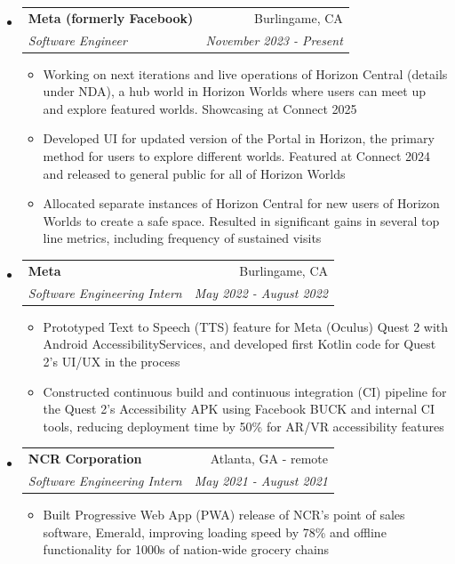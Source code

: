 \documentclass[letterpaper,11pt]{article}
\makeatletter
\newcommand{\resitem}[1]{\item #1 \vspace{-2pt}}
\newcommand{\ressubheading}[4]{
\begin{tabular*}{7.0in}{l@{\extracolsep{\fill}}r}
		\textbf{#1} & #2 \\
		\textit{#3} & \textit{#4} \\
\end{tabular*}\vspace{-6pt}}
\makeatother
\begin{document}
\begin{itemize}
\item
    \ressubheading{Meta (formerly Facebook)}{Burlingame, CA}{Software Engineer}{November 2023 - Present}
    \begin{itemize}
        \resitem{Working on next iterations and live operations of Horizon Central (details under NDA), a hub world in Horizon Worlds where users can meet up and explore featured worlds. Showcasing at Connect 2025}
        \resitem{Developed UI for updated version of the Portal in Horizon, the primary method for users to explore different worlds. Featured at Connect 2024 and released to general public for all of Horizon Worlds}
        \resitem{Allocated separate instances of Horizon Central for new users of Horizon Worlds to create a safe space. Resulted in significant gains in several top line metrics, including frequency of sustained visits}
    \end{itemize}
\item
    \ressubheading{Meta}{Burlingame, CA}{Software Engineering Intern}{May 2022 - August 2022}
    \begin{itemize}
        \resitem{Prototyped Text to Speech (TTS) feature for Meta (Oculus) Quest 2 with Android AccessibilityServices, and developed first Kotlin code for Quest 2's UI/UX in the process}
        \resitem{Constructed continuous build and continuous integration (CI) pipeline for the Quest 2's Accessibility APK using Facebook BUCK and internal CI tools, reducing deployment time by 50\% for AR/VR accessibility features}
    \end{itemize}
\item
    \ressubheading{NCR Corporation}{Atlanta, GA - remote}{Software Engineering Intern}{May 2021 - August 2021}
    \begin{itemize}
        \resitem{Built Progressive Web App (PWA) release of NCR's point of sales software, Emerald, improving loading speed by 78\% and offline functionality for 1000s of nation-wide grocery chains}

\end{itemize}
\end{itemize}
\end{document}
